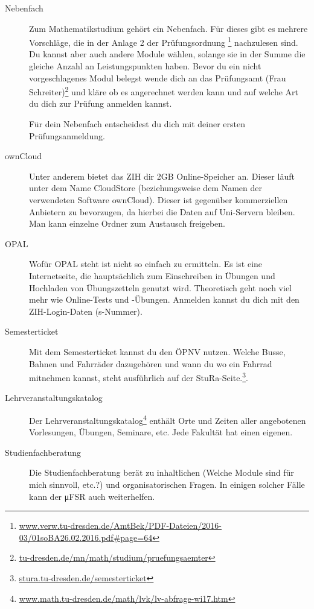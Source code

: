 \documentclass{scrartcl}
\begin{document}
\begin{description}
  \item[Nebenfach] Zum Mathematikstudium gehört ein Nebenfach.
    Für dieses gibt es mehrere Vorschläge, die in der Anlage 2 der Prüfungsordnung
    \footnote{\url{www.verw.tu-dresden.de/AmtBek/PDF-Dateien/2016-03/01soBA26.02.2016.pdf\#page=64}}
    nachzulesen sind.
    Du kannst aber auch andere Module wählen, solange sie in der Summe
    die gleiche Anzahl an Leistungspunkten haben.
    Bevor du ein nicht vorgeschlagenes Modul belegst wende dich an
    das Prüfungsamt (Frau Schreiter)\footnote{\url{tu-dresden.de/mn/math/studium/pruefungsaemter}}
    und kläre ob es angerechnet werden kann und auf welche Art
    du dich zur Prüfung anmelden kannst.

    Für dein Nebenfach entscheidest du dich mit deiner ersten
    Prüfungsanmeldung.
  \item[ownCloud] Unter anderem bietet das ZIH dir 2GB Online-Speicher an.
    Dieser läuft unter dem Name CloudStore (beziehungsweise dem Namen der verwendeten Software ownCloud).
    Dieser ist gegenüber kommerziellen Anbietern zu bevorzugen,
    da hierbei die Daten auf Uni-Servern bleiben. Man kann einzelne Ordner zum Austausch freigeben.
  \item[OPAL] Wofür OPAL steht ist nicht so einfach zu ermitteln. Es ist eine Internetseite, die hauptsächlich
    zum Einschreiben in Übungen und Hochladen von Übungszetteln genutzt wird. Theoretisch geht noch viel mehr
    wie Online-Tests und -Übungen.
    Anmelden kannst du dich mit den ZIH-Login-Daten (s-Nummer).
  \item[Semesterticket] Mit dem Semesterticket kannst du den ÖPNV nutzen. Welche Busse, Bahnen und Fahrräder dazugehören und wann du wo ein Fahrrad mitnehmen kannst,
    steht ausführlich auf der StuRa-Seite.\footnote{\url{stura.tu-dresden.de/semesterticket}}.
  \item[Lehrveranstaltungskatalog] Der Lehrveranstaltungskatalog\footnote{\url{www.math.tu-dresden.de/math/lvk/lv-abfrage-wi17.htm}} enthält Orte und Zeiten aller angebotenen
    Vorlesungen, Übungen, Seminare, etc. Jede Fakultät hat einen eigenen.
  \item[Studienfachberatung] Die Studienfachberatung berät zu
    inhaltlichen (Welche Module sind für mich sinnvoll, etc.?)
    und organisatorischen Fragen.
    In einigen solcher Fälle kann der μFSR auch weiterhelfen.


\end{description}
\end{document}
